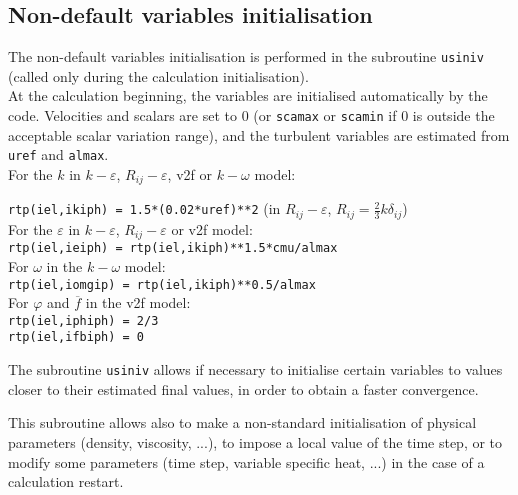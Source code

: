{{%
\subsection{Non-default variables initialisation} \label{sec:usiniv}

The non-default variables initialisation is performed in the subroutine \texttt{usiniv} (called only during the calculation initialisation).\\ At the calculation beginning, the variables are initialised
automatically by the code. Velocities and scalars are set to 0 (or \texttt{scamax} or \texttt{scamin} if 0 is outside the acceptable
scalar variation range), and the turbulent variables are estimated from
\texttt{uref} and \texttt{almax}. \\
For the $k$ in $k-\varepsilon$, $R_{ij}-\varepsilon$, v2f or $k-\omega$
model:\\
{\texttt{rtp(iel,ikiph) = 1.5*(0.02*uref)**2}
(in $R_{ij}-\varepsilon$,  $R_{ij}=\frac{2}{3}k\delta_{ij}$)\\
For the $\varepsilon$ in $k-\varepsilon$, $R_{ij}-\varepsilon$ or v2f model:\\
\texttt{rtp(iel,ieiph) = rtp(iel,ikiph)**1.5*cmu/almax}\\
For $\omega$ in the $k-\omega$ model:\\
\texttt{rtp(iel,iomgip) = rtp(iel,ikiph)**0.5/almax}\\
For $\varphi$ and $\overline{f}$ in the v2f model:\\
\texttt{rtp(iel,iphiph) = 2/3}\\
\texttt{rtp(iel,ifbiph) = 0}

The subroutine \texttt{usiniv} allows if necessary to initialise certain
variables to values closer to their estimated final values, in order to
obtain a faster convergence.

This subroutine allows also to make a non-standard initialisation of
physical parameters (density, viscosity, ...), to impose a local
value of the time step, or to modify some parameters (time step,
variable specific heat, ...) in the case of a calculation restart.

}}}
